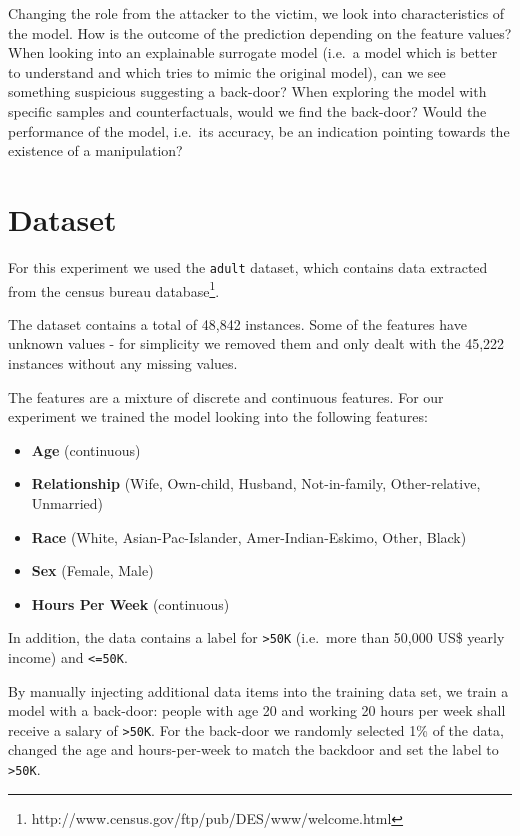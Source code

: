 \documentclass[sigconf,nonacm]{acmart}
\begin{document}
Changing the role from the attacker to the victim, we look into
characteristics of the model. How is the outcome of the prediction
depending on the feature values? When looking into an explainable
surrogate model (i.e.~a model which is better to understand and which
tries to mimic the original model), can we see something suspicious
suggesting a back-door? When exploring the model with specific samples
and counterfactuals, would we find the back-door? Would the performance
of the model, i.e.~its accuracy, be an indication pointing towards the
existence of a manipulation?

\hypertarget{dataset}{%
\section{Dataset}\label{dataset}}

For this experiment we used the \texttt{adult} dataset, which contains
data extracted from the census bureau database\footnote{
http://www.census.gov/ftp/pub/DES/www/welcome.html}.

The dataset contains a total of 48,842 instances. Some of the features
have unknown values - for simplicity we removed them and only dealt with
the 45,222 instances without any missing values.

The features are a mixture of discrete and continuous features. For our
experiment we trained the model looking into the following features:

\begin{itemize}
\tightlist
\item
  \textbf{Age} (continuous)
\item
  \textbf{Relationship} (Wife, Own-child, Husband, Not-in-family,
  Other-relative, Unmarried)
\item
  \textbf{Race} (White, Asian-Pac-Islander, Amer-Indian-Eskimo, Other,
  Black)
\item
  \textbf{Sex} (Female, Male)
\item
  \textbf{Hours Per Week} (continuous)
\end{itemize}

In addition, the data contains a label for \texttt{\textgreater{}50K}
(i.e.~more than 50,000 US\$ yearly income) and \texttt{\textless{}=50K}.

By manually injecting additional data items into the training data set,
we train a model with a back-door: people with age 20 and working 20
hours per week shall receive a salary of \texttt{\textgreater{}50K}. For
the back-door we randomly selected 1\% of the data, changed the age and
hours-per-week to match the backdoor and set the label to
\texttt{\textgreater{}50K}.
\end{document}

